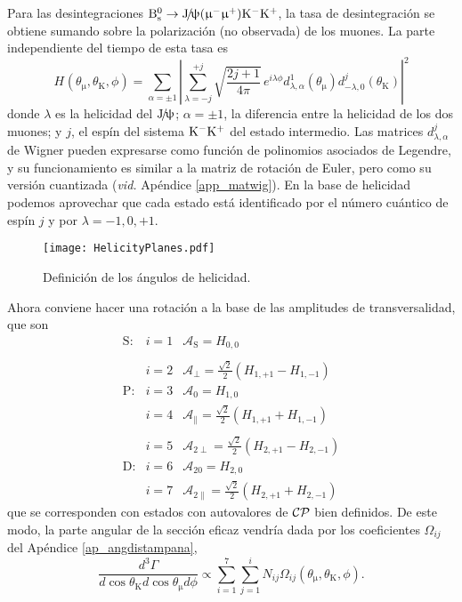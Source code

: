 Para las desintegraciones $\text{B}{}_{\text{s}}^{0} \rightarrow \text{J}\!/\!\uppsi (\upmu{}^{-} \upmu{}^{+}) \text{K}{}^{-} \text{K}{}^{+}$, la tasa de desintegración se obtiene sumando sobre la polarización (no observada) de los muones. La parte independiente del tiempo de esta tasa es \cite{zhang2013time}
\begin{equation}
	H_{} (\theta_{\upmu},\theta_{\text{K}},\phi) = \sum_{\alpha = \pm 1} \left|\sum_{\lambda = -j}^{+j} \sqrt{\frac{2j+1}{4\pi}}\, e^{i \lambda \phi} d_{\lambda,\alpha}^{1}(\theta_{\upmu})
	d_{-\lambda,0}^{j}(\theta_{\text{K}}) \right|^2
\end{equation}
%
donde $\lambda$ es la helicidad del $\text{J}\!/\!\uppsi$; $\alpha=\pm1$, la diferencia entre la helicidad de los dos muones; y $j$, el espín del sistema $\text{K}{}^{-} \text{K}{}^{+}$ del estado intermedio. 
%
Las matrices $d_{\lambda,\alpha}^{j}$ de Wigner pueden expresarse como función de polinomios asociados de Legendre, y su funcionamiento es similar a la matriz de rotación de Euler, pero como su versión cuantizada (\emph{vid.} Apéndice \ref{app_matwig}). En la base de helicidad podemos aprovechar que cada estado está identificado por el número cuántico de espín $j$ y por $\lambda = {-1,0,+1}$.

\begin{figure}[H]
\centering
\texttt{[image: HelicityPlanes.pdf]}
\caption{Definición de los ángulos de helicidad.} \label{fig_angdist}
\end{figure}


Ahora conviene hacer una rotación a la base de las amplitudes de transversalidad, que son
\begin{equation}
\begin{array}{ccl}
\text{S}:& i=1 & \mathcal{A}_{\text{S}} = H_{0,0} \\ \\
  & i=2 & \mathcal{A}_{\perp} = \frac{\sqrt{2}}{2} (H_{1,+1}-H_{1,-1})   \\
\text{P}:& i=3 & \mathcal{A}_{0} = H_{1,0} \\
  & i=4 & \mathcal{A}_{\parallel} = \frac{\sqrt{2}}{2} (H_{1,+1}+H_{1,-1}) \\ \\
  & i=5 & \mathcal{A}_{2\perp} = \frac{\sqrt{2}}{2} (H_{2,+1}-H_{2,-1}) \\
\text{D}:& i=6 & \mathcal{A}_{20} = H_{2,0} \\
  & i=7 & \mathcal{A}_{2\parallel} = \frac{\sqrt{2}}{2} (H_{2,+1}+H_{2,-1})  
\end{array}	\label{eq:amps}
\end{equation}
que se corresponden con estados con autovalores de $\mathcal{CP}$ bien definidos. De este modo, la parte angular de la sección eficaz vendría dada por los coeficientes $\Omega_{ij}$ del Apéndice \ref{ap_angdistampana},
\begin{equation}
\frac{d^3 \Gamma}{d\cos\theta_{\text{K}} d\cos\theta_{\upmu} d\phi} \propto \sum_{i=1}^{7}  \sum_{j=1}^i N_{ij} \Omega_{ij}(\theta_{\upmu},\theta_{\text{K}},\phi).
\end{equation}


